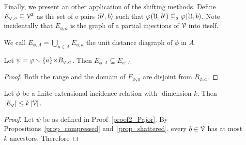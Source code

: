 \documentclass[sputnik.tex]{subfiles}
\begin{document}
Finally, we present an other application of the shifting methods. Define $E_{\varphi,a}\subseteq\EuScript V^2$ as the set of e pairs $\langle b',b\rangle$ such that $\varphi(\EuScript U,b')\subseteq_a\varphi(\EuScript U,b)$. 
Note incidentally that $E_{\phi,a}$ is the graph of a partial injections of $\EuScript V$ into itself. 

We call $\displaystyle E_{\phi,A}=\bigcup_{a\in A}E_{\phi,a}$ the unit distance diagraph of $\phi$ in $A$. 

\begin{proposition}\label{prop_udd1} 
Let $\psi=\varphi\smallsetminus\{a\}{\times}B_{\varphi,a}$. Then $E_{\phi,A}\subseteq E_{\psi,A}$
\end{proposition}
\begin{proof}Both the range and the domain of $E_{\phi,a}$ are disjoint from $B_{\phi,a}$.
\end{proof}

\begin{proposition}
Let $\phi$ be a finite extensional incidence relation with \vc-dimension $k$.
Then $|E_\varphi|\le k\,|\EuScript V|$.
\end{proposition}

\begin{proof}
Let $\psi$ be as defined in Proof~\ref{proof2_Pajor}.
By Propositions~\ref{prop_compressed} and~\ref{prop_shattered}, every $b\in\EuScript V$ has at most $k$ ancestors.
Therefore

\end{proof}
\end{document}
